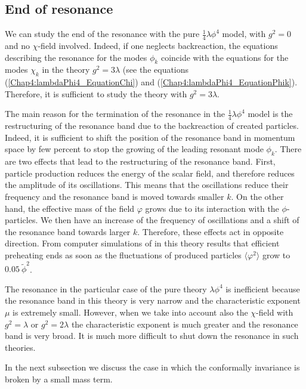 \documentclass[11pt,a4paper,twoside]{book}
\begin{document}
\subsection{End of resonance}
We can study the end of the resonance with the pure $ \frac{1}{4}\lambda\phi^{4} $ model, with $ g^{2}=0 $ and no $\chi$-field involved. Indeed, if one neglects backreaction, the equations describing the resonance for the modes $\phi_{k}$ coincide with the equations for the modes $\chi_{k}$ in the theory $ g^{2}=3\lambda $ (see the equations (\ref{Chap4:lambdaPhi4_EquationChi}) and (\ref{Chap4:lambdaPhi4_EquationPhik}). Therefore, it is sufficient to study the theory with $ g^{2}=3\lambda $.

The main reason for the termination of the resonance in the $ \frac{1}{4}\lambda \phi^{4} $ model is the restructuring of the resonance band due to the backreaction of created particles. Indeed, it is sufficient to shift the position of the resonance band in momentum space by few percent to stop the growing of the leading resonant mode $\phi_{k}$.
There are two effects that lead to the restructuring of the resonance band. First, particle production reduces the energy  of the scalar field, and therefore reduces the amplitude of its oscillations. This means that the oscillations reduce their frequency and the resonance band is moved towards smaller $ k $. On the other hand, the effective mass of the field $\varphi$ grows due to its interaction with the $\phi$-particles. We then have an increase of the frequency of oscillations and a shift of the resonance band towards larger $ k $. Therefore, these effects act in opposite direction. 
From computer simulations of \cite{Chap4:ModelLambdaPhi4Reference} in this theory results that efficient preheating ends as soon as the fluctuations of produced particles $ \langle \varphi^{2}\rangle  $ grow to $ 0.05\ \tilde{\phi}^{2} $.

The  resonance in the particular case  of the pure theory $ \lambda\phi^{4} $ is inefficient because the resonance band in this theory is very narrow and the characteristic exponent $\mu$ is extremely small. However, when we take into account also the $\chi$-field with $ g^{2}=\lambda $ or $ g^{2}=2\lambda $ the characteristic exponent is much greater and the resonance band is very broad. It is much more difficult to shut down the resonance in such theories.

In the next subsection we discuss the case in which the conformally invariance is broken by a small mass term.
\end{document}
